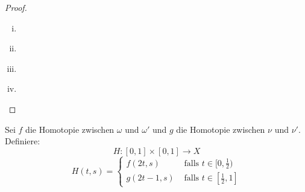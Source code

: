 \documentclass[a4paper,10pt]{scrartcl}
\begin{document}
\begin{proof}
\begin{enumerate}[(i)]
\item 
\begin{figure}[ht]
\centering

\end{figure}
\item 
\begin{figure}[ht]
\centering

\end{figure}
\item 
\begin{figure}[H]
\centering

\end{figure}
\item 
\begin{figure}[H]
\centering

\end{figure}
\end{enumerate}
\end{proof}
\begin{note*}
Sei $f$ die Homotopie zwischen $\omega$ und $\omega'$ und $g$ die Homotopie zwischen $\nu$ und $ \nu'$. Definiere:
\[
 H:[0,1]\times[0,1]\to X
\]
\[
 H(t,s)=\begin{cases} f(2t, s) &\text{ falls } t\in [0, \frac{1}{2}) \\ g(2t-1,s) &\text{ falls } t\in [\frac{1}{2}, 1] \end{cases}
\]
\end{note*}
\end{document}
